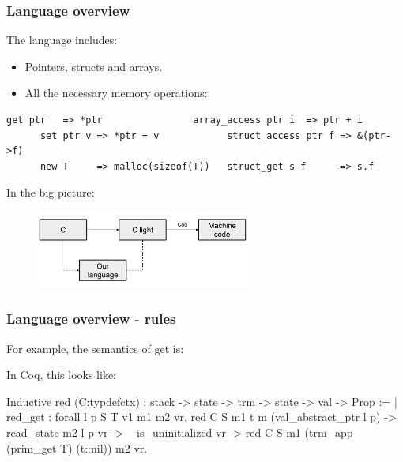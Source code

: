 \begin{frame}[fragile]
\frametitle{Language overview}

The language includes:
\begin{itemize}
	\item Pointers, structs and arrays.
	\item All the necessary memory operations:
\end{itemize}

\begin{Verbatim}[fontsize=\scriptsize]
      get ptr   => *ptr                array_access ptr i  => ptr + i
      set ptr v => *ptr = v            struct_access ptr f => &(ptr->f)
      new T     => malloc(sizeof(T))   struct_get s f      => s.f
\end{Verbatim}

\bigskip

In the big picture:

\begin{figure}[H]
\centering
\includegraphics[width=7cm]{images/compcert_our_language}
\end{figure}

\end{frame}


\begin{frame}[fragile]
\frametitle{Language overview - rules}

For example, the semantics of get is:
\begin{center}
\end{center}

\bigskip

In Coq, this looks like:

\begin{coqs}
Inductive red (C:typdefctx) : stack -> state -> trm -> state -> val -> Prop :=
  | red_get : forall l p S T v1 m1 m2 vr,
      red C S m1 t m (val_abstract_ptr l p) ->
      read_state m2 l p vr ->
      ~ is_uninitialized vr ->
      red C S m1 (trm_app (prim_get T) (t::nil)) m2 vr.
\end{coqs}

\end{frame}



